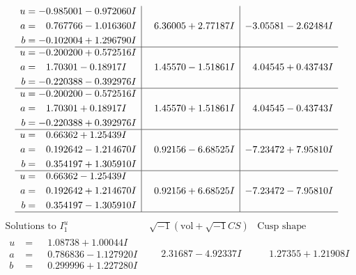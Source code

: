 \documentclass[1p]{elsarticle_modified}
\theoremstyle{definition}
\newcommand{\I}{\sqrt{-1}}
\begin{document}
$$\begin{array}{c|c|c}
\begin{aligned}
u &= -0.985001 - 0.972060 I \\
a &= \phantom{-}0.767766 - 1.016360 I \\
b &= -0.102004 + 1.296790 I\end{aligned}
 & \phantom{-}6.36005 + 2.77187 I & -3.05581 - 2.62484 I \\ \hline\begin{aligned}
u &= -0.200200 + 0.572516 I \\
a &= \phantom{-}1.70301 - 0.18917 I \\
b &= -0.220388 - 0.392976 I\end{aligned}
 & \phantom{-}1.45570 - 1.51861 I & \phantom{-}4.04545 + 0.43743 I \\ \hline\begin{aligned}
u &= -0.200200 - 0.572516 I \\
a &= \phantom{-}1.70301 + 0.18917 I \\
b &= -0.220388 + 0.392976 I\end{aligned}
 & \phantom{-}1.45570 + 1.51861 I & \phantom{-}4.04545 - 0.43743 I \\ \hline\begin{aligned}
u &= \phantom{-}0.66362 + 1.25439 I \\
a &= \phantom{-}0.192642 - 1.214670 I \\
b &= \phantom{-}0.354197 + 1.305910 I\end{aligned}
 & \phantom{-}0.92156 - 6.68525 I & -7.23472 + 7.95810 I \\ \hline\begin{aligned}
u &= \phantom{-}0.66362 - 1.25439 I \\
a &= \phantom{-}0.192642 + 1.214670 I \\
b &= \phantom{-}0.354197 - 1.305910 I\end{aligned}
 & \phantom{-}0.92156 + 6.68525 I & -7.23472 - 7.95810 I\\
 \hline 
 \end{array}$$\newpage$$\begin{array}{c|c|c}  
\text{Solutions to }I^u_{1}& \I (\text{vol} + \sqrt{-1}CS) & \text{Cusp shape}\\
 \hline 
\begin{aligned}
u &= \phantom{-}1.08738 + 1.00044 I \\
a &= \phantom{-}0.786836 - 1.127920 I \\
b &= \phantom{-}0.299996 + 1.227280 I\end{aligned}
 & \phantom{-}2.31687 - 4.92337 I & \phantom{-}1.27355 + 1.21908 I \\ \hline\begin{aligned}

\end{aligned}
\end{array}$$
\end{document}
